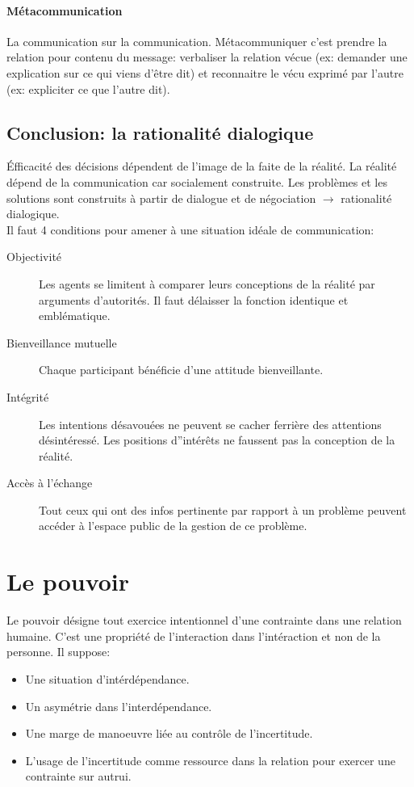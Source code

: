 \documentclass[11pt]{article} %
\begin{document}
	\paragraph{Métacommunication} La communication sur la communication. Métacommuniquer c'est prendre la relation pour contenu du message: verbaliser la relation vécue (ex: demander une explication sur ce qui viens d'être dit) et reconnaitre le vécu exprimé par l'autre (ex: expliciter ce que l'autre dit).


	\subsection{Conclusion: la rationalité dialogique}
		Éfficacité des décisions dépendent de l'image de la faite de la réalité. La réalité dépend de la
		communication car socialement construite. Les problèmes et les solutions sont construits à partir
		de dialogue et de négociation $\to$ rationalité dialogique.\\
		Il faut 4 conditions pour amener à une situation idéale de communication:
		\begin{description}
			\item[Objectivité] Les agents se limitent à comparer leurs conceptions de la réalité par arguments
			d'autorités. Il faut délaisser la fonction identique et emblématique.
			\item[Bienveillance mutuelle] Chaque participant bénéficie d'une attitude bienveillante.
			\item[Intégrité] Les intentions désavouées ne peuvent se cacher ferrière des attentions 
			désintéressé. Les positions d''intérêts ne faussent pas la conception de la réalité.
			\item[Accès à l'échange] Tout ceux qui ont des infos pertinente par rapport à un problème peuvent
			accéder à l'espace public de la gestion de ce problème. 
		\end{description}

	

\section{Le pouvoir}
	Le pouvoir désigne tout exercice intentionnel d'une contrainte dans une relation humaine. C'est une
	propriété de l'interaction dans l'intéraction et non de la personne. Il suppose:
	\begin{itemize}
		\item Une situation d'intérdépendance.
		\item Un asymétrie dans l'interdépendance.
		\item Une marge de manoeuvre liée au contrôle de l'incertitude.
		\item L'usage de l'incertitude comme ressource dans la relation pour exercer une contrainte sur autrui.
	\end{itemize}
\end{document}
